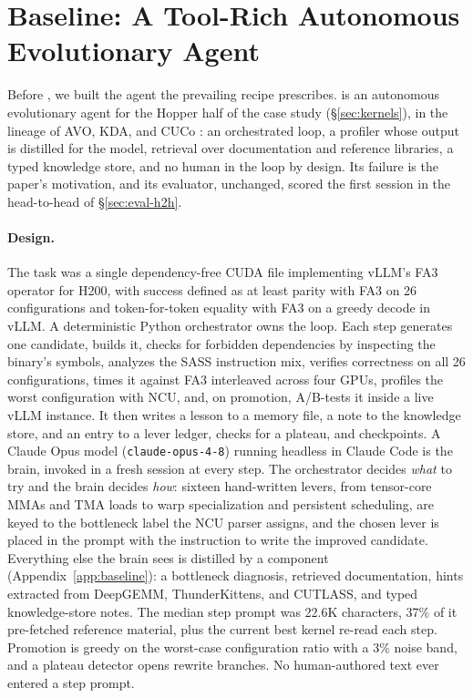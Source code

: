 \section{Baseline: A Tool-Rich Autonomous Evolutionary Agent}
\label{sec:baseline}

Before \sys, we built the agent the prevailing recipe prescribes. \baseline is an autonomous
evolutionary agent for the Hopper half of the case study (\S\ref{sec:kernels}), in the lineage of
AVO, KDA, and CUCo \cite{chen2026avo,han2026kda,cuco2026}: an orchestrated loop, a profiler whose
output is distilled for the model, retrieval over documentation and reference libraries, a typed
knowledge store, and no human in the loop by design. Its failure is the paper's motivation, and its
evaluator, unchanged, scored the first \sys session in the head-to-head of \S\ref{sec:eval-h2h}.

\paragraph{Design.} The task was a single dependency-free CUDA file implementing vLLM's FA3 operator
for H200, with success defined as at least parity with FA3 on 26 configurations and token-for-token
equality with FA3 on a greedy decode in vLLM. A deterministic Python orchestrator owns the loop. Each
step generates one candidate, builds it, checks for forbidden dependencies by inspecting the binary's
symbols, analyzes the SASS instruction mix, verifies correctness on all 26 configurations, times it
against FA3 interleaved across four GPUs, profiles the worst configuration with NCU, and, on
promotion, A/B-tests it inside a live vLLM instance. It then writes a lesson to a memory file, a note
to the knowledge store, and an entry to a lever ledger, checks for a plateau, and checkpoints. A
Claude Opus model (\texttt{claude-opus-4-8}) running headless in Claude Code is the brain, invoked in
a fresh session at every step. The orchestrator decides \emph{what} to try and the brain decides
\emph{how}: sixteen hand-written levers, from tensor-core MMAs and TMA
loads to warp specialization and persistent scheduling, are keyed to the bottleneck label the NCU parser assigns, and the
chosen lever is placed in the prompt with the instruction to write the improved candidate. Everything
else the brain sees is distilled by a component (Appendix~\ref{app:baseline}): a bottleneck
diagnosis, retrieved documentation, hints extracted from DeepGEMM, ThunderKittens, and CUTLASS, and
typed knowledge-store notes. The median step prompt was 22.6K characters, 37\% of it pre-fetched
reference material, plus the current best kernel re-read each step. Promotion is greedy on the worst-case configuration ratio with a 3\% noise band,
and a plateau detector opens rewrite branches. No human-authored text ever entered a step prompt.

